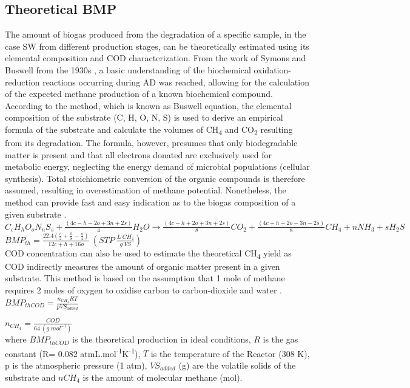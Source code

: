 \subsection{Theoretical BMP}
The amount of biogas produced from the degradation of a specific sample, in the case SW from different production stages, can be theoretically estimated using its elemental composition and COD characterization. From the work of Symons and Buswell from the 1930s \cite{Symons_1933}, a basic understanding of the biochemical oxidation-reduction reactions occurring during AD was reached, allowing for the calculation of the expected methane production of a known biochemical compound. According to the method, which is known as Buswell equation, the elemental composition of the substrate (C, H, O, N, S) is used to derive an empirical formula of the substrate and calculate the volumes of CH\textsubscript{4} and CO\textsubscript{2} resulting from its degradation. The formula, however, presumes that only biodegradable matter is present and that all electrons donated are exclusively used for metabolic energy, neglecting the energy demand of microbial populations (cellular synthesis)\cite{Labatut_2011,Lesteur_2010}. Total stoichiometric conversion of the organic compounds is therefore assumed, resulting in overestimation of methane potential. Nonetheless, the method can provide fast and easy indication as to the biogas composition of a given substrate \cite{Ware_2016}.\\

\(C_cH_hO_oN_nS_s+\frac{(4c-h-2o+3n+2s)}{4}H_2O→\frac{(4c-h+2o+3n+2s)}{8}CO_2+\frac{(4c+h-2o-3n-2s)}{8}CH_4+nNH_3+sH_2S\)\\

\(BMP_{th}=\frac{22.4\left(\frac{c}{2}+\frac{h}{8}-\frac{o}{4}\right)}{12c+h+16o}\ \left(STP\ \frac{L\ CH_4}{g\ VS}\right)\)\\

COD concentration can also be used to estimate the theoretical CH\textsubscript{4} yield as COD indirectly measures the amount of organic matter present in a given substrate. This method is based on the assumption that 1 mole of methane requires 2 moles of oxygen to oxidise carbon to carbon-dioxide and water \cite{Jingura_2017,Nielfa_2015}. 
\\
\(BMP_{thCOD}=\frac{n_{CH_4}RT}{pVS_{added}}\)

\(n_{CH_4}=\frac{COD}{64\ \left(g.mol^{-1}\right)}\)
\\
where $BMP_{thCOD}$ is the theoretical production in ideal conditions, $R$ is the gas constant (R= 0.082 atmL.mol\textsuperscript{-1}K\textsuperscript{-1}), $T$ is the temperature of the Reactor (308 K), p is the atmospheric pressure (1 atm), $VS_{added}$ (g) are the volatile solids of the substrate and $nCH_4$ is the amount of molecular methane (mol).


